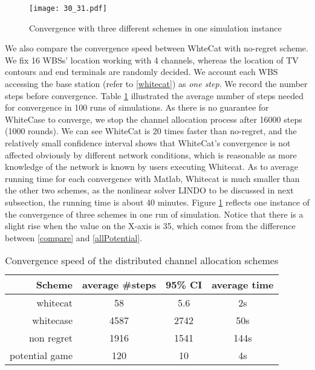 

\begin{figure}[h!]
  \centering
  \texttt{[image: 30\_31.pdf]}
  \caption{Convergence with three different schemes in one simulation instance}
\label{convergeComp}
\end{figure}


We also compare the convergence speed between WhteCat with no-regret scheme. We fix 16 WBSs' location working with 4 channels, whereas the location of TV contours and end terminals are randomly decided. We account each WBS accessing the base station (refer to \ref{whitecat}) as \textit{one step}. We record the number steps before convergence. Table \ref{convergencespeed} illustrated the average number of steps needed for convergence in 100 runs of simulations. As there is no guarantee for WhiteCase to converge, we stop the channel allocation process after 16000 steps (1000 rounds). We can see WhiteCat is 20 times faster than no-regret, and the relatively small confidence interval shows that WhiteCat's convergence is not affected obviously by different network conditions, which is reasonable as more knowledge of the network is known by users executing Whitecat. As to average running time for each convergence with Matlab, Whitecat is much smaller than the other two schemes, as the nonlinear solver LINDO to be discussed in next subsection, the running time is about 40 minutes. Figure \ref{convergeComp} reflects one instance of the convergence of three schemes in one run of simulation. Notice that there is a slight rise when the value on the X-axis is 35, which comes from the difference between \ref{compare} and \ref{allPotential}.

\begin{table}[!h]
\centering
\begin{tabular}{|r|c|c|c|}
  \hline
  Scheme			 						& average \#steps 	 		& 95\% CI			&average time\\
    \hline
  whitecat									& 58											& 5.6						&2s\\\hline
  whitecase 								& 4587 											& 2742						&50s\\\hline %
  non regret									& 1916											& 1541						&144s\\\hline
  potential game 							& 120							& 10										&4s\\
  \hline
\end{tabular}
\caption{Convergence speed of the distributed channel allocation schemes}
\label{convergencespeed}
\end{table}


